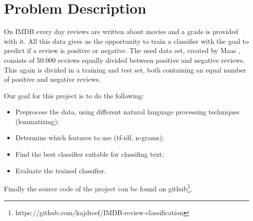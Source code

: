 \section{Problem Description}

On IMDB every day reviews are written about movies and a grade is provided with it.
All this data gives us the opportunity to train a classifier with the goal to predict if a review is positive or negative.
The used data set, created by Maas \etal \cite{Maas:2011}, consists of 50.000 reviews equally divided between positive and negative reviews. 
This again is divided in a training and test set, both containing an equal number of positive and negative reviews.

Our goal for this project is to do the following:
\begin{itemize}
\item Preprocess the data, using different natural language processing techniques (\eg lemmatizing);
\item Determine which features to use (\eg tf-idf, n-grams);
\item Find the best classifier suitable for classifing text;
\item Evaluate the trained classifier.
\end{itemize}

Finally the source code of the project can be found on github\footnote{https://github.com/kajdreef/IMDB-review-classification}.